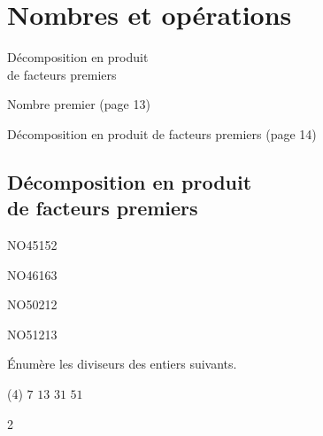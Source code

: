\documentclass[a4paper,12pt]{report}
\begin{document}
\newcommand{\chapterName}{Nombres et opérations}
\newcommand{\serieName}{Décomposition en produit\\de facteurs premiers
}


\chapter*{\chapterName}
\thispagestyle{empty}

\begin{amL}{\serieName}{
\item Nombre premier (page 13)
\item Décomposition en produit de facteurs premiers (page 14)

}
\end{amL}

\section*{\serieName}
\setcounter{page}{1}
\thispagestyle{firstPage}





\begin{exof}{NO45}{15}{2}
\end{exof}
\begin{exof}{NO46}{16}{3}
\end{exof}

\begin{exol}{NO50}{21}{2}
\end{exol}
\begin{exol}{NO51}{21}{3}
\end{exol}







\begin{exo}{
    Énumère les diviseurs des entiers suivants. 
    \begin{tasks}[label-width = 1em ,item-indent = 2em ,before-skip = -0.4em, after-skip = -0.4em , label-offset=0.666em,after-item-skip = 0.3em](4)
    \task $7$
    \task $13$
    \task $31$
    \task $51$
\end{tasks}
}{2}\end{exo}
    
\end{document}
